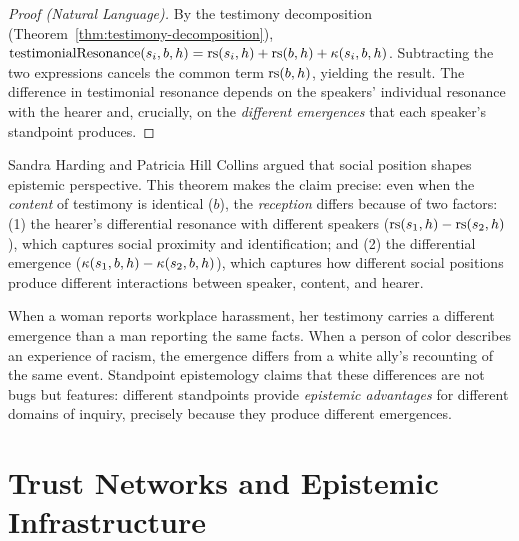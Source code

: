 \begin{proof}[Proof (Natural Language)]
By the testimony decomposition (Theorem~\ref{thm:testimony-decomposition}),
$\mathrm{testimonialResonance}(s_i, b, h) = \mathrm{rs}(s_i, h) + \mathrm{rs}(b, h) + \kappa(s_i, b, h)$.
Subtracting the two expressions cancels the common term $\mathrm{rs}(b, h)$, yielding
the result. The difference in testimonial resonance depends on the speakers'
individual resonance with the hearer and, crucially, on the \emph{different
emergences} that each speaker's standpoint produces.
\end{proof}

\begin{interpretation}
Sandra Harding and Patricia Hill Collins argued that social position shapes
epistemic perspective. This theorem makes the claim precise: even when the
\emph{content} of testimony is identical ($b$), the \emph{reception} differs
because of two factors: (1) the hearer's differential resonance with different
speakers ($\mathrm{rs}(s_1, h) - \mathrm{rs}(s_2, h)$), which captures social proximity and
identification; and (2) the differential emergence ($\kappa(s_1, b, h) -
\kappa(s_2, b, h)$), which captures how different social positions produce
different interactions between speaker, content, and hearer.

When a woman reports workplace harassment, her testimony carries a different
emergence than a man reporting the same facts. When a person of color describes
an experience of racism, the emergence differs from a white ally's recounting
of the same event. Standpoint epistemology claims that these differences are
not bugs but features: different standpoints provide \emph{epistemic
advantages} for different domains of inquiry, precisely because they produce
different emergences.
\end{interpretation}

\section{Trust Networks and Epistemic Infrastructure}

